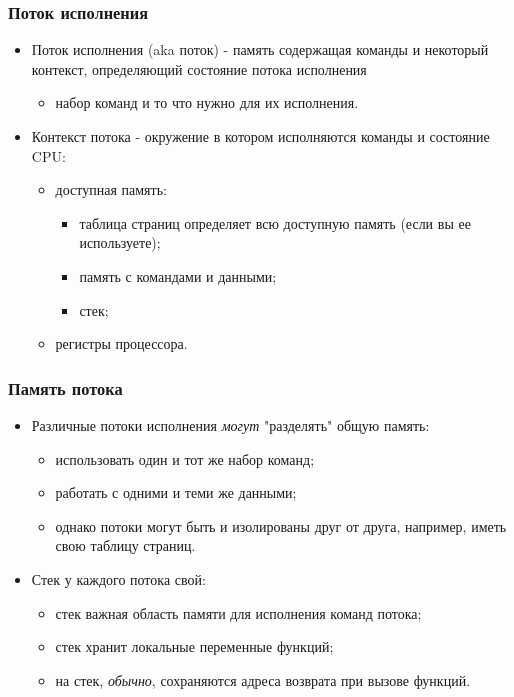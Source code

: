 \begin{frame}
\frametitle{Поток исполнения}
\begin{itemize}
  \item Поток исполнения (aka поток) - память содержащая команды и некоторый
  контекст, определяющий состояние потока исполнения
  \begin{itemize}
    \item набор команд и то что нужно для их исполнения.
  \end{itemize}
  \item Контекст потока - окружение в котором исполняются команды и состояние
  CPU:
  \begin{itemize}
    \item доступная память:
    \begin{itemize}
      \item таблица страниц определяет всю доступную память (если вы ее
      используете);
      \item память с командами и данными;
      \item стек;
    \end{itemize}
    \item регистры процессора.
  \end{itemize}
\end{itemize}
\end{frame}

\begin{frame}
\frametitle{Память потока}
\begin{itemize}
  \item Различные потоки исполнения \emph{могут} "разделять" общую память:
  \begin{itemize}
    \item использовать один и тот же набор команд;
    \item работать с одними и теми же данными;
    \item однако потоки могут быть и изолированы друг от друга, например, иметь
    свою таблицу страниц.
  \end{itemize}
  \item Стек у каждого потока свой:
  \begin{itemize}
    \item стек важная область памяти для исполнения команд потока;
    \item стек хранит локальные переменные функций;
    \item на стек, \emph{обычно}, сохраняются адреса возврата при вызове
    функций.
  \end{itemize}
\end{itemize}
\end{frame}

